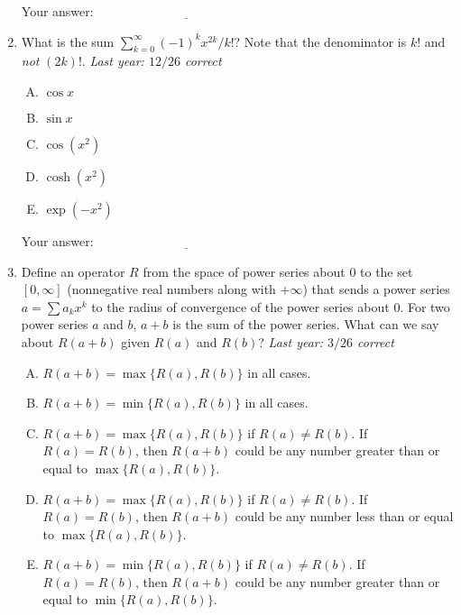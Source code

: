 \documentclass[10pt]{amsart}
\begin{document}
\begin{enumerate}
  \vspace{0.1in}
  Your answer: $\underline{\qquad\qquad\qquad\qquad\qquad\qquad\qquad}$
  \vspace{0.15in}

\item What is the sum $\sum_{k=0}^\infty (-1)^kx^{2k}/k!$? Note that
  the denominator is $k!$ and {\em not} $(2k)!$. {\em Last year:
  $12/26$ correct}

  \begin{enumerate}[(A)]
  \item $\cos x$
  \item $\sin x$
  \item $\cos(x^2)$
  \item $\cosh(x^2)$
  \item $\exp(-x^2)$
  \end{enumerate}

  \vspace{0.1in}
  Your answer: $\underline{\qquad\qquad\qquad\qquad\qquad\qquad\qquad}$
  \vspace{0.15in}

\item Define an operator $R$ from the space of power series about $0$
  to the set $[0,\infty]$ (nonnegative real numbers along with
  $+\infty$) that sends a power series $a = \sum a_kx^k$ to the radius
  of convergence of the power series about $0$. For two power series
  $a$ and $b$, $a + b$ is the sum of the power series. What can we say
  about $R(a + b)$ given $R(a)$ and $R(b)$? {\em Last year: $3/26$ correct}

  \begin{enumerate}[(A)]
  \item $R(a + b) = \max \{ R(a), R(b) \}$ in all cases.
  \item $R(a + b) = \min \{ R(a), R(b) \}$ in all cases.
  \item $R(a + b) = \max \{ R(a), R(b) \}$ if $R(a) \ne R(b)$. If
    $R(a) = R(b)$, then $R(a + b)$ could be any number greater than or
    equal to $\max \{ R(a), R(b) \}$.
  \item $R(a + b) = \max \{ R(a), R(b) \}$ if $R(a) \ne R(b)$. If
    $R(a) = R(b)$, then $R(a + b)$ could be any number less than or
    equal to $\max \{ R(a), R(b) \}$.
  \item $R(a + b) = \min \{ R(a), R(b) \}$ if $R(a) \ne R(b)$. If
    $R(a) = R(b)$, then $R(a + b)$ could be any number greater than or
    equal to $\min \{ R(a), R(b) \}$.
  \end{enumerate}


\end{enumerate}
\end{document}
